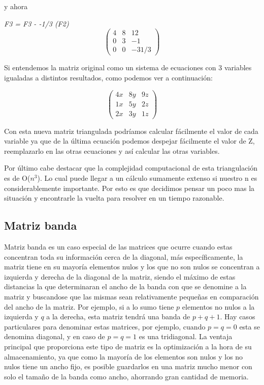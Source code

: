 y ahora

\emph{F3 = F3 - -1/3 (F2) } 
\[ \left( \begin{array}{ccc}
4 & 8 & 12 \\
0 & 3 & -1 \\
0 & 0 & -31/3 \end{array} \right)\] 

Si entendemos la matriz original como un sistema de ecuaciones con 3 variables igualadas a distintos resultados, como podemos ver a continuación:

\[ \left( \begin{array}{ccc}
4x & 8y & 9z \\
1x & 5y & 2z \\
2x & 3y & 1z \end{array} \right)\] 

Con esta nueva matriz triangulada podríamos calcular fácilmente el valor de cada variable ya que de la última ecuación podemos despejar fácilmente el valor de Z, reemplazarlo en las otras ecuaciones y así calcular las otras variables.



Por último cabe destacar que la complejidad computacional de esta triangulación es de O($n^3$). Lo cual puede llegar a un cálculo sumamente extenso si nuestro n es considerablemente importante. Por esto es que decidimos pensar un poco mas la situación y encontrarle la vuelta para resolver en un tiempo razonable.

\subsection{Matriz banda}

Matriz banda es un caso especial de las matrices que ocurre cuando estas concentran toda su información cerca de la diagonal, más específicamente, la matriz tiene en su mayoría elementos nulos y los que no son nulos se concentran a izquierda y derecha de la diagonal de la matriz, siendo el máximo de estas distancias la que determinaran el ancho de la banda con que se denomine a la matriz y buscandose que las mismas sean relativamente pequeñas en comparación del ancho de la matriz. Por ejemplo, si a lo sumo tiene $p$ elementos no nulos a la izquierda y $q$ a la derecha, esta matriz tendrá una banda de $p+q+1$. Hay casos particulares para denominar estas matrices, por ejemplo, cuando $p = q = 0$ esta se denomina diagonal, y en caso de $p = q = 1$  es una tridiagonal.
La ventaja principal que proporciona este tipo de matriz es la optimización a la hora de su almacenamiento, ya que como la mayoría de los elementos son nulos y los no nulos tiene un ancho fijo, es posible guardarlos en una matriz mucho menor con solo el tamaño de la banda como ancho, ahorrando gran cantidad de memoria.

